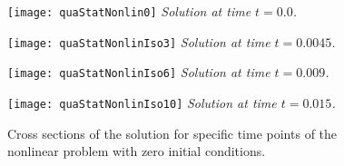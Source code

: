\documentclass[12pt]{article}
\numberwithin{equation}{section}
\begin{document}
\begin{figure}[tbhp]
\begin{minipage}{0.47\linewidth}
\begin{center}
\texttt{[image: quaStatNonlin0]} 
\textit{Solution at time $t = 0.0$.}
\end{center} 
\end{minipage}
\hfill
\vspace{0.2 cm}
\begin{minipage}{0.47\linewidth}
\begin{center}
\texttt{[image: quaStatNonlinIso3]} 
\textit{Solution at time $t = 0.0045$.}
\end{center}
\end{minipage}
\vfill
\vspace{0.2 cm}
\begin{minipage}{0.47\linewidth}
\begin{center}
\texttt{[image: quaStatNonlinIso6]} 
\textit{Solution at time $t = 0.009$.}
\end{center}
\end{minipage}
\hfill
\begin{minipage}{0.47\linewidth}
\begin{center}
\texttt{[image: quaStatNonlinIso10]} 
\textit{Solution at time $t = 0.015$.}
\end{center}
\end{minipage}
\caption{Cross sections of the solution for specific time points of the nonlinear problem with zero initial conditions.}
\label{fig:sol_motor_zero_initial_conditions}
\end{figure}
\end{document}
